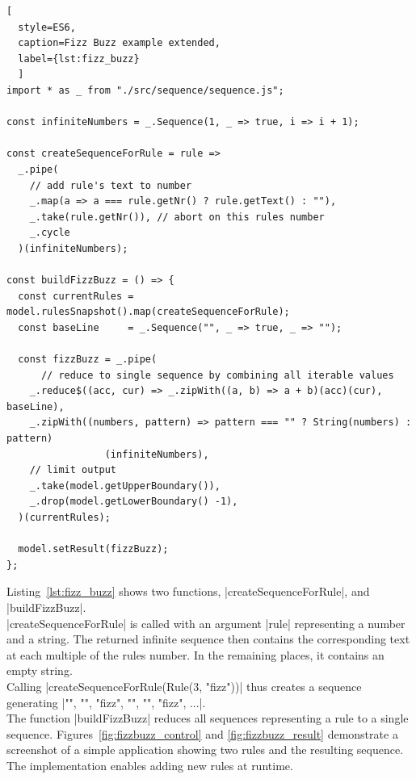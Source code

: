 \begin{lstlisting}[
  style=ES6, 
  caption=Fizz Buzz example extended,
  label={lst:fizz_buzz}
  ]
import * as _ from "./src/sequence/sequence.js";

const infiniteNumbers = _.Sequence(1, _ => true, i => i + 1);

const createSequenceForRule = rule =>
  _.pipe(
    // add rule's text to number
    _.map(a => a === rule.getNr() ? rule.getText() : ""),     
    _.take(rule.getNr()), // abort on this rules number
    _.cycle
  )(infiniteNumbers);

const buildFizzBuzz = () => {
  const currentRules = model.rulesSnapshot().map(createSequenceForRule);
  const baseLine     = _.Sequence("", _ => true, _ => "");

  const fizzBuzz = _.pipe(
      // reduce to single sequence by combining all iterable values
    _.reduce$((acc, cur) => _.zipWith((a, b) => a + b)(acc)(cur), baseLine), 
    _.zipWith((numbers, pattern) => pattern === "" ? String(numbers) : pattern)
                 (infiniteNumbers), 
    // limit output
    _.take(model.getUpperBoundary()),
    _.drop(model.getLowerBoundary() -1),
  )(currentRules);

  model.setResult(fizzBuzz);
};
\end{lstlisting}
Listing~\ref{lst:fizz_buzz} shows two functions, |createSequenceForRule|, and
|buildFizzBuzz|. \\ 
|createSequenceForRule| is called with an argument |rule| representing a
number and a string. The returned infinite sequence then contains the
corresponding text at each multiple of the rules number. In the remaining
places, it contains an empty string. \\ 
Calling |createSequenceForRule(Rule(3, "fizz"))| thus creates a sequence
generating |"", "", "fizz", "", "", "fizz", ...|.\\
The function |buildFizzBuzz| reduces all sequences representing a rule to a
single sequence. 
Figures~\ref{fig:fizzbuzz_control} and \ref{fig:fizzbuzz_result} demonstrate a
screenshot of a simple application showing two rules and the resulting sequence.
The implementation enables adding new rules at runtime.

